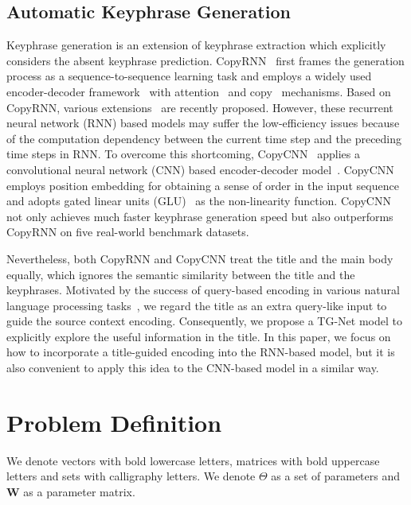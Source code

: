 \documentclass[letterpaper]{article} %
\begin{document}
\subsection{Automatic Keyphrase Generation}
Keyphrase generation is an extension of keyphrase extraction which explicitly considers the absent keyphrase prediction. CopyRNN~\cite{meng2017dkg} first frames the generation process as a sequence-to-sequence learning task and employs a widely used encoder-decoder framework~\cite{sutskever2014sequence2sequence} with attention~\cite{bahdanau2014attention} and copy~\cite{gu2016incorporating_copy} mechanisms. Based on CopyRNN, various extensions~\cite{HaiYe2018ssl,JunChen2018CorrRNN} are recently proposed. However, these recurrent neural network (RNN) based models may suffer the low-efficiency issues because of the computation dependency between the current time step and the preceding time steps in RNN. To overcome this shortcoming, CopyCNN~\cite{zhang2017dkg_conv} applies a convolutional neural network (CNN) based encoder-decoder model~\cite{gehring2017convolutional_seq2seq}. CopyCNN employs position embedding for obtaining a sense of order in the input sequence and adopts gated linear units (GLU)~\cite{dauphin2017language_glu} as the non-linearity function. CopyCNN not only achieves much faster keyphrase generation speed but also outperforms CopyRNN on five real-world benchmark datasets.

Nevertheless, both CopyRNN and CopyCNN treat the title and the main body equally, which ignores the semantic similarity between the title and the keyphrases. Motivated by the success of query-based encoding in various natural language processing tasks~\cite{gao2018generating,song2017unified,nema2017diversity,wang2017gated}, we regard the title as an extra query-like input to guide the source context encoding. Consequently, we propose a TG-Net model to explicitly explore the useful information in the title. In this paper, we focus on how to incorporate a title-guided encoding into the RNN-based model, but it is also convenient to apply this idea to the CNN-based model in a similar way.

\section{Problem Definition} \label{problem_definition}
We denote vectors with bold lowercase letters, matrices with bold uppercase letters and sets with calligraphy letters. We denote $\Theta$ as a set of parameters and $\mathbf{W}$ as a parameter matrix.
\end{document}
